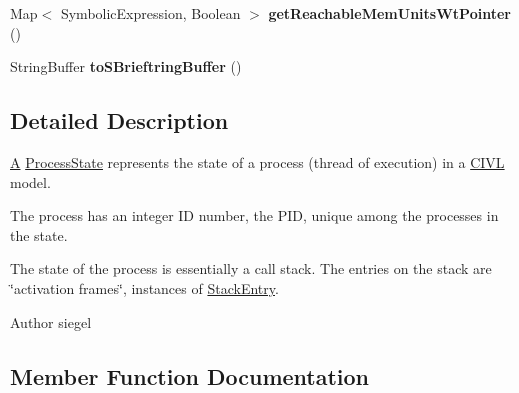 \begin{DoxyCompactItemize}
\item 
\hypertarget{interfaceedu_1_1udel_1_1cis_1_1vsl_1_1civl_1_1state_1_1IF_1_1ProcessState_afb859e7260af5efd6e2d44a4060c0bc0}{}Map$<$ Symbolic\+Expression, Boolean $>$ {\bfseries get\+Reachable\+Mem\+Units\+Wt\+Pointer} ()\label{interfaceedu_1_1udel_1_1cis_1_1vsl_1_1civl_1_1state_1_1IF_1_1ProcessState_afb859e7260af5efd6e2d44a4060c0bc0}

\item 
\hypertarget{interfaceedu_1_1udel_1_1cis_1_1vsl_1_1civl_1_1state_1_1IF_1_1ProcessState_ac728c81abbc121c59b9f1798978a421e}{}String\+Buffer {\bfseries to\+S\+Brieftring\+Buffer} ()\label{interfaceedu_1_1udel_1_1cis_1_1vsl_1_1civl_1_1state_1_1IF_1_1ProcessState_ac728c81abbc121c59b9f1798978a421e}

\end{DoxyCompactItemize}


\subsection{Detailed Description}
\hyperlink{structA}{A} \hyperlink{interfaceedu_1_1udel_1_1cis_1_1vsl_1_1civl_1_1state_1_1IF_1_1ProcessState}{Process\+State} represents the state of a process (thread of execution) in a \hyperlink{classedu_1_1udel_1_1cis_1_1vsl_1_1civl_1_1CIVL}{C\+I\+V\+L} model. 

The process has an integer I\+D number, the P\+I\+D, unique among the processes in the state.

The state of the process is essentially a call stack. The entries on the stack are \char`\"{}activation frames\char`\"{}, instances of \hyperlink{interfaceedu_1_1udel_1_1cis_1_1vsl_1_1civl_1_1state_1_1IF_1_1StackEntry}{Stack\+Entry}.

\begin{DoxyAuthor}{Author}
siegel 
\end{DoxyAuthor}


\subsection{Member Function Documentation}
\hypertarget{interfaceedu_1_1udel_1_1cis_1_1vsl_1_1civl_1_1state_1_1IF_1_1ProcessState_a024696cc7cc27f3fbbe48d98e2969d8a}{}
